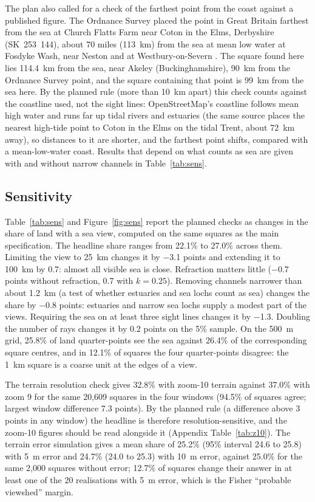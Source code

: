 \documentclass[11pt,a4paper]{article}
\begin{document}
The plan also called for a check of the farthest point from the coast against a published figure. The Ordnance Survey placed the point in Great Britain farthest from the sea at Church Flatts Farm near Coton in the Elms, Derbyshire (SK~253~144), about 70 miles (113~km) from the sea at mean low water at Fosdyke Wash, near Neston and at Westbury-on-Severn \citep{haran2003}. The square found here lies 114.4~km from the sea, near Akeley (Buckinghamshire), 90~km from the Ordnance Survey point, and the square containing that point is 99~km from the sea here. By the planned rule (more than 10~km apart) this check counts against the coastline used, not the sight lines: OpenStreetMap's coastline follows mean high water and runs far up tidal rivers and estuaries (the same source places the nearest high-tide point to Coton in the Elms on the tidal Trent, about 72~km away), so distances to it are shorter, and the farthest point shifts, compared with a mean-low-water coast. Results that depend on what counts as sea are given with and without narrow channels in Table~\ref{tab:sens}.

\subsection{Sensitivity}
Table~\ref{tab:sens} and Figure~\ref{fig:sens} report the planned checks as changes in the share of land with a sea view, computed on the same squares as the main specification. The headline share ranges from 22.1\% to 27.0\% across them. Limiting the view to 25~km changes it by $-$3.1 points and extending it to 100~km by 0.7: almost all visible sea is close. Refraction matters little ($-$0.7 points without refraction, 0.7 with $k=0.25$). Removing channels narrower than about 1.2~km (a test of whether estuaries and sea lochs count as sea) changes the share by $-$0.8 points: estuaries and narrow sea lochs supply a modest part of the views. Requiring the sea on at least three sight lines changes it by $-$1.3. Doubling the number of rays changes it by 0.2 points on the 5\% sample. On the 500~m grid, 25.8\% of land quarter-points see the sea against 26.4\% of the corresponding square centres, and in 12.1\% of squares the four quarter-points disagree: the 1~km square is a coarse unit at the edges of a view.

The terrain resolution check gives 32.8\% with zoom-10 terrain against 37.0\% with zoom 9 for the same 20,609 squares in the four windows (94.5\% of squares agree; largest window difference 7.3 points). By the planned rule (a difference above 3 points in any window) the headline is therefore resolution-sensitive, and the zoom-10 figures should be read alongside it (Appendix Table~\ref{tab:z10}). The terrain error simulation gives a mean share of 25.2\% (95\% interval 24.6 to 25.8) with 5~m error and 24.7\% (24.0 to 25.3) with 10~m error, against 25.0\% for the same 2,000 squares without error; 12.7\% of squares change their answer in at least one of the 20 realisations with 5~m error, which is the Fisher ``probable viewshed'' margin.
\end{document}
